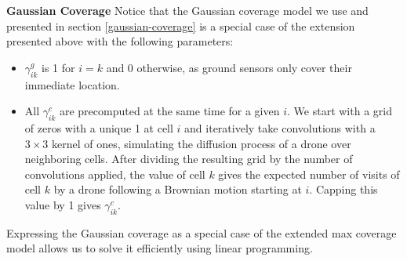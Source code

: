 \documentclass{article}
\begin{document}
\textbf{Gaussian Coverage}
Notice that the Gaussian coverage model we use and presented in section \ref{gaussian-coverage} is a special case of the extension presented above with the following parameters: 
\begin{itemize}
    \item $\gamma^g_{ik}$ is 1 for $i = k$ and 0 otherwise, as ground sensors only cover their immediate location.
    \item All $\gamma^c_{ik}$ are precomputed at the same time for a given $i$. We start with a grid of zeros with a unique 1 at cell $i$ and iteratively take convolutions with a $3 \times 3$ kernel of ones, simulating the diffusion process of a drone over neighboring cells. After dividing the resulting grid by the number of convolutions applied, the value of cell $k$ gives the expected number of visits of cell $k$ by a drone following a Brownian motion starting at $i$. Capping this value by 1 gives $\gamma^c_{ik}$.
\end{itemize}
 Expressing the Gaussian coverage as a special case of the extended max coverage model allows us to solve it efficiently using linear programming.
\end{document}
